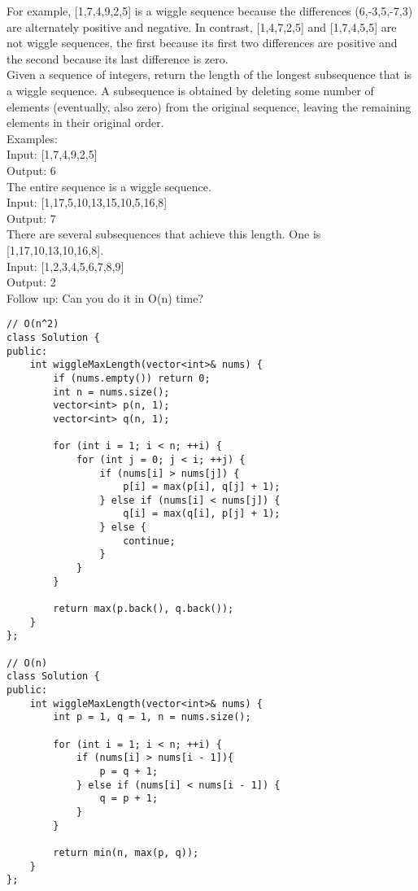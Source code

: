 For example, [1,7,4,9,2,5] is a wiggle sequence because the differences (6,-3,5,-7,3) are alternately positive and negative. In contrast, [1,4,7,2,5] and [1,7,4,5,5] are not wiggle sequences, the first because its first two differences are positive and the second because its last difference is zero.\\

Given a sequence of integers, return the length of the longest subsequence that is a wiggle sequence. A subsequence is obtained by deleting some number of elements (eventually, also zero) from the original sequence, leaving the remaining elements in their original order.\\

Examples:\\

Input: [1,7,4,9,2,5]\\
Output: 6\\
The entire sequence is a wiggle sequence.\\

Input: [1,17,5,10,13,15,10,5,16,8]\\
Output: 7\\
There are several subsequences that achieve this length. One is [1,17,10,13,10,16,8].\\

Input: [1,2,3,4,5,6,7,8,9]\\
Output: 2\\

Follow up: Can you do it in O(n) time? \\

\begin{lstlisting}
// O(n^2)
class Solution {
public:
    int wiggleMaxLength(vector<int>& nums) {
        if (nums.empty()) return 0;
        int n = nums.size();
        vector<int> p(n, 1);
        vector<int> q(n, 1);
        
        for (int i = 1; i < n; ++i) {
            for (int j = 0; j < i; ++j) {
                if (nums[i] > nums[j]) {
                    p[i] = max(p[i], q[j] + 1);
                } else if (nums[i] < nums[j]) {
                    q[i] = max(q[i], p[j] + 1);
                } else {
                    continue;
                }
            }
        }
        
        return max(p.back(), q.back());
    }
};

// O(n)
class Solution {
public:
    int wiggleMaxLength(vector<int>& nums) {
        int p = 1, q = 1, n = nums.size();
        
        for (int i = 1; i < n; ++i) {
            if (nums[i] > nums[i - 1]){ 
                p = q + 1;
            } else if (nums[i] < nums[i - 1]) {
                q = p + 1;
            }
        }
        
        return min(n, max(p, q));
    }
};
\end{lstlisting}


